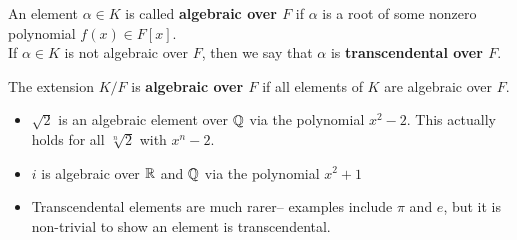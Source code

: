 \documentclass{memoir}
\begin{document}
\begin{defn}
	An element \(\alpha \in K\) is called \textbf{algebraic over \(F\)} if \(\alpha \) is a root of some nonzero polynomial \(f(x) \in F[x]\).\\

	If \(\alpha  \in K\) is not algebraic over \(F\), then we say that \(\alpha \) is \textbf{transcendental over \(F\)}.
\end{defn}
The extension \(K / F\) is \textbf{algebraic over \(F\)} if all elements of \(K\) are algebraic over \(F\).

\begin{exmp}
	\begin{itemize}
		\item \(\sqrt{2} \) is an algebraic element over \(\mathbb{Q}\) via the polynomial \(x^2-2\). This actually holds for all \(\sqrt[n]{2} \) with \(x^{n}-2\).
		\item \(i\) is algebraic over \(\mathbb{R}\) and \(\mathbb{Q}\) via the polynomial \(x^2+1\) 
		\item Transcendental elements are much rarer-- examples include \(\pi \) and \(e\), but it is non-trivial to show an element is transcendental.
	\end{itemize}
\end{exmp}
\end{document}
